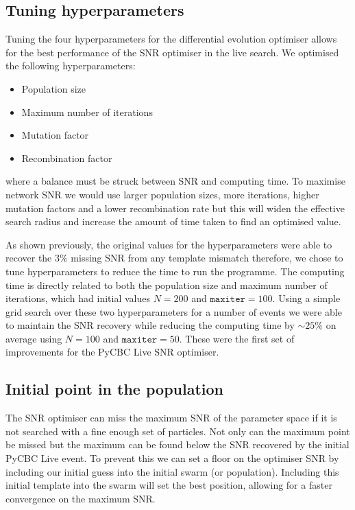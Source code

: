 \subsection{\label{7:sec:de_hyperparameter_tuning}Tuning hyperparameters}

Tuning the four hyperparameters for the differential evolution optimiser allows for the best performance of the SNR optimiser in the live search. We optimised the following hyperparameters:
%
\begin{itemize}
    \item Population size
    \item Maximum number of iterations
    \item Mutation factor
    \item Recombination factor
\end{itemize}
%
where a balance must be struck between SNR and computing time. To maximise network SNR we would use larger population sizes, more iterations, higher mutation factors and a lower recombination rate but this will widen the effective search radius and increase the amount of time taken to find an optimised value.

As shown previously, the original values for the hyperparameters were able to recover the $3\%$ missing SNR from any template mismatch therefore, we chose to tune hyperparameters to reduce the time to run the programme. The computing time is directly related to both the population size and maximum number of iterations, which had initial values $N = 200$ and $\texttt{maxiter} = 100$. Using a simple grid search over these two hyperparameters for a number of events we were able to maintain the SNR recovery while reducing the computing time by ${\sim}25\%$ on average using $N = 100$ and $\texttt{maxiter} = 50$. These were the first set of improvements for the PyCBC Live SNR optimiser.

\subsection{Initial point in the population}

The SNR optimiser can miss the maximum SNR of the parameter space if it is not searched with a fine enough set of particles. Not only can the maximum point be missed but the maximum can be found below the SNR recovered by the initial PyCBC Live event. To prevent this we can set a floor on the optimiser SNR by including our initial guess into the initial swarm (or population). Including this initial template into the swarm will set the best position, allowing for a faster convergence on the maximum SNR.

